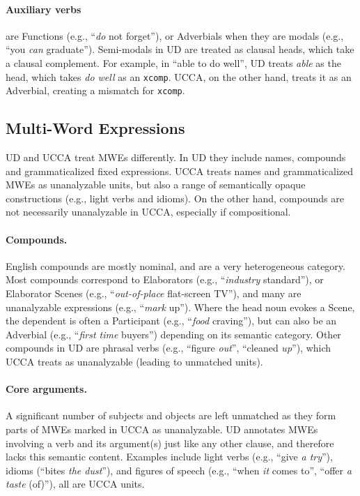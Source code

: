 \documentclass[11pt,a4paper,table]{article}
\begin{document}
\paragraph{Auxiliary verbs}
    are Functions (e.g., ``\textit{do} not forget''),
    or Adverbials when they are modals (e.g., ``you \textit{can} graduate''). Semi-modals 
    in UD are treated as clausal heads, which take a clausal complement. 
    For example, in ``able to do well'', UD treats \textit{able} as the head,
    which takes \textit{do well} as an \texttt{xcomp}. UCCA, on the other hand,
    treats it as an Adverbial, creating a mismatch for \texttt{xcomp}.
    

\subsection{Multi-Word Expressions}\label{sec:mwe}

UD and UCCA treat MWEs differently.
In UD they include names, compounds and grammaticalized fixed expressions.
UCCA treats names and grammaticalized MWEs as unanalyzable units,
but also a range of semantically opaque constructions
(e.g., light verbs and idioms).
On the other hand, compounds are not necessarily unanalyzable in UCCA,
especially if compositional.

\paragraph{Compounds.} English compounds are mostly nominal,
        and are a very heterogeneous category.
        Most compounds correspond to Elaborators (e.g., ``\textit{industry} standard''),
        or Elaborator Scenes (e.g., ``\textit{out-of-place} flat-screen TV''),
        and many are unanalyzable expressions (e.g., ``\textit{mark} up'').
        Where the head noun evokes a Scene, the dependent is often a Participant
        (e.g., ``\textit{food} craving''), but can also be an Adverbial 
        (e.g., ``\textit{first time} buyers'') depending on its semantic category.
        Other compounds in UD are phrasal verbs (e.g., ``figure \textit{out}'', ``cleaned \textit{up}''),
        which UCCA treats as unanalyzable (leading to unmatched units). 
            
\paragraph{Core arguments.}
      A significant number of subjects and objects are left unmatched as they
      form parts of MWEs marked in UCCA as unanalyzable. UD annotates
      MWEs involving a verb and its argument(s) just like any other clause, and therefore
      lacks this semantic content. Examples include light verbs (e.g., ``give {\it a try}''),
      idioms (``bites {\it the dust}''), and figures of speech (e.g., ``when \textit{it} comes to'', ``offer \textit{a taste} (of)''),
      all are UCCA units.
      
\end{document}

